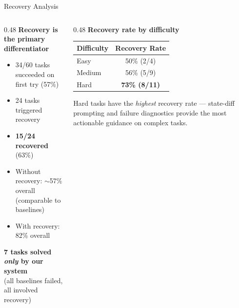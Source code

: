 \documentclass[aspectratio=169]{beamer}
\begin{document}
\begin{frame}{Recovery Analysis}

\begin{columns}[T]
\begin{column}{0.48\textwidth}
\textbf{Recovery is the primary differentiator}

\vspace{0.2cm}
\begin{itemize}
    \item 34/60 tasks succeeded on first try (57\%)
    \item 24 tasks triggered recovery
    \item \textbf{15/24 recovered} (63\%)
    \item Without recovery: $\sim$57\% overall \\ (comparable to baselines)
    \item With recovery: 82\% overall
\end{itemize}

\vspace{0.2cm}
\textbf{7 tasks solved \textit{only} by our system} \\
{\small (all baselines failed, all involved recovery)}
\end{column}

\begin{column}{0.48\textwidth}
\textbf{Recovery rate by difficulty}

\vspace{0.2cm}
\begin{tabular}{lc}
\toprule
\textbf{Difficulty} & \textbf{Recovery Rate} \\
\midrule
Easy & 50\% (2/4) \\
Medium & 56\% (5/9) \\
Hard & \textbf{73\% (8/11)} \\
\bottomrule
\end{tabular}

\vspace{0.3cm}
Hard tasks have the \textit{highest} recovery rate --- state-diff prompting and failure diagnostics provide the most actionable guidance on complex tasks.
\end{column}
\end{columns}

\end{frame}
\end{document}
